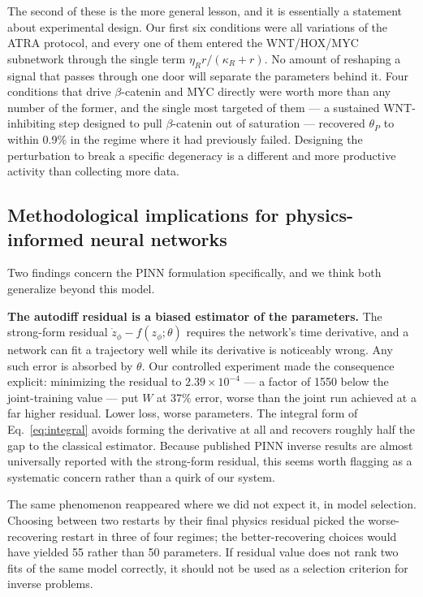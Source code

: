 \documentclass[11pt]{article}
\newcommand{\bcat}{$\beta$-\hspace{0pt}catenin}
\newcommand{\thP}{\theta_P}
\begin{document}
The second of these is the more general lesson, and it is essentially a
statement about experimental design. Our first six conditions were all
variations of the ATRA protocol, and every one of them entered the WNT/HOX/MYC
subnetwork through the single term $\eta_R r/(\kappa_R+r)$. No amount of
reshaping a signal that passes through one door will separate the parameters
behind it. Four conditions that drive \bcat{} and MYC directly were worth more
than any number of the former, and the single most targeted of them --- a
sustained WNT-inhibiting step designed to pull \bcat{} out of saturation ---
recovered $\thP$ to within 0.9\% in the regime where it had previously failed.
Designing the perturbation to break a specific degeneracy is a different and
more productive activity than collecting more data.

\subsection{Methodological implications for physics-informed neural networks}

Two findings concern the PINN formulation specifically, and we think both
generalize beyond this model.

\textbf{The autodiff residual is a biased estimator of the parameters.} The
strong-form residual $\dot z_\phi - f(z_\phi;\theta)$ requires the network's
time derivative, and a network can fit a trajectory well while its derivative is
noticeably wrong. Any such error is absorbed by $\theta$. Our controlled
experiment made the consequence explicit: minimizing the residual to
$2.39\times10^{-4}$ --- a factor of 1550 below the joint-training value --- put
$W$ at 37\% error, worse than the joint run achieved at a far higher residual.
Lower loss, worse parameters. The integral form of Eq.~\eqref{eq:integral}
avoids forming the derivative at all and recovers roughly half the gap to the
classical estimator. Because published PINN inverse results are almost
universally reported with the strong-form residual, this seems worth flagging
as a systematic concern rather than a quirk of our system.

The same phenomenon reappeared where we did not expect it, in model selection.
Choosing between two restarts by their final physics residual picked the
worse-recovering restart in three of four regimes; the better-recovering
choices would have yielded 55 rather than 50 parameters. If residual value does
not rank two fits of the same model correctly, it should not be used as a
selection criterion for inverse problems.
\end{document}
